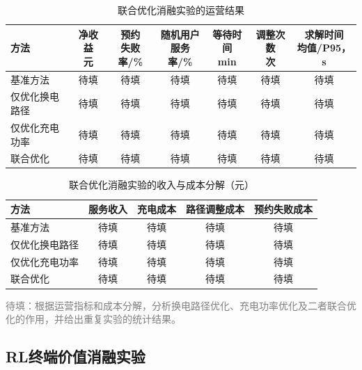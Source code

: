 \documentclass[12pt,a4paper,UTF8]{ctexart}
\numberwithin{equation}{section}
\newcommand{\todoresult}[1]{\textcolor{gray}{#1}}
\begin{document}
\begin{table}[!htbp]
  \centering
  \caption{联合优化消融实验的运营结果}
  \label{exp:joint_results}
  \small
  \setlength{\tabcolsep}{3pt}
  \begin{tabularx}{\linewidth}{@{}Xcccccc@{}}
    \toprule
    方法 & \shortstack{净收益\\元} & \shortstack{预约\\失败率/\%} & \shortstack{随机用户\\服务率/\%} & \shortstack{等待时间\\min} & \shortstack{调整次数\\次} & \shortstack{求解时间\\均值/P95，s} \\
    \midrule
    基准方法 & 待填 & 待填 & 待填 & 待填 & 待填 & 待填 \\
    仅优化换电路径 & 待填 & 待填 & 待填 & 待填 & 待填 & 待填 \\
    仅优化充电功率 & 待填 & 待填 & 待填 & 待填 & 待填 & 待填 \\
    联合优化 & 待填 & 待填 & 待填 & 待填 & 待填 & 待填 \\
    \bottomrule
  \end{tabularx}
\end{table}

\begin{table}[!htbp]
  \centering
  \caption{联合优化消融实验的收入与成本分解（元）}
  \label{exp:joint_costs}
  \small
  \begin{tabularx}{\linewidth}{@{}Xcccc@{}}
    \toprule
    方法 & 服务收入 & 充电成本 & 路径调整成本 & 预约失败成本 \\
    \midrule
    基准方法 & 待填 & 待填 & 待填 & 待填 \\
    仅优化换电路径 & 待填 & 待填 & 待填 & 待填 \\
    仅优化充电功率 & 待填 & 待填 & 待填 & 待填 \\
    联合优化 & 待填 & 待填 & 待填 & 待填 \\
    \bottomrule
  \end{tabularx}
\end{table}

\todoresult{待填：根据运营指标和成本分解，分析换电路径优化、充电功率优化及二者联合优化的作用，并给出重复实验的统计结果。}

\FloatBarrier
\subsection{RL终端价值消融实验}
\label{exp:terminal}
\end{document}
